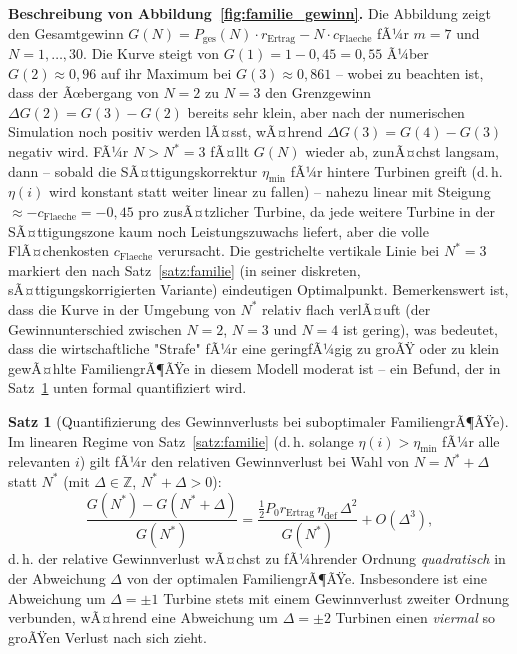 ﻿\documentclass[a4paper,12pt]{article}
\theoremstyle{definition}
\newtheorem{satz}{Satz}
\begin{document}
\textbf{Beschreibung von Abbildung~\ref{fig:familie_gewinn}.}
Die Abbildung zeigt den Gesamtgewinn $G(N)=P_{\mathrm{ges}}(N)\cdot r_{\mathrm{Ertrag}} - N\cdot c_{\mathrm{Flaeche}}$ fÃ¼r $m=7$ und $N=1,\ldots,30$. Die Kurve steigt von $G(1)=1-0{,}45=0{,}55$ Ã¼ber $G(2)\approx0{,}96$ auf ihr Maximum bei $G(3)\approx0{,}861$ -- wobei zu beachten ist, dass der Ãœbergang von $N=2$ zu $N=3$ den Grenzgewinn $\Delta G(2)=G(3)-G(2)$ bereits sehr klein, aber nach der numerischen Simulation noch positiv werden lÃ¤sst, wÃ¤hrend $\Delta G(3)=G(4)-G(3)$ negativ wird. FÃ¼r $N>N^*=3$ fÃ¤llt $G(N)$ wieder ab, zunÃ¤chst langsam, dann -- sobald die SÃ¤ttigungskorrektur $\eta_{\min}$ fÃ¼r hintere Turbinen greift (d.\,h. $\eta(i)$ wird konstant statt weiter linear zu fallen) -- nahezu linear mit Steigung $\approx-c_{\mathrm{Flaeche}}=-0{,}45$ pro zusÃ¤tzlicher Turbine, da jede weitere Turbine in der SÃ¤ttigungszone kaum noch Leistungszuwachs liefert, aber die volle FlÃ¤chenkosten $c_{\mathrm{Flaeche}}$ verursacht. Die gestrichelte vertikale Linie bei $N^*=3$ markiert den nach Satz~\ref{satz:familie} (in seiner diskreten, sÃ¤ttigungskorrigierten Variante) eindeutigen Optimalpunkt. Bemerkenswert ist, dass die Kurve in der Umgebung von $N^*$ relativ flach verlÃ¤uft (der Gewinnunterschied zwischen $N=2$, $N=3$ und $N=4$ ist gering), was bedeutet, dass die wirtschaftliche "Strafe" fÃ¼r eine geringfÃ¼gig zu groÃŸ oder zu klein gewÃ¤hlte FamiliengrÃ¶ÃŸe in diesem Modell moderat ist -- ein Befund, der in Satz~\ref{satz:familie_robustheit} unten formal quantifiziert wird.

\begin{satz}[Quantifizierung des Gewinnverlusts bei suboptimaler FamiliengrÃ¶ÃŸe]
\label{satz:familie_robustheit}
Im linearen Regime von Satz~\ref{satz:familie} (d.\,h. solange $\eta(i)>\eta_{\min}$ fÃ¼r alle relevanten $i$) gilt fÃ¼r den relativen Gewinnverlust bei Wahl von $N=N^*+\Delta$ statt $N^*$ (mit $\Delta\in\mathbb{Z}$, $N^*+\Delta>0$):
\[
\frac{G(N^*)-G(N^*+\Delta)}{G(N^*)} = \frac{\tfrac{1}{2}P_0 r_{\mathrm{Ertrag}}\,\eta_{\mathrm{def}}\,\Delta^2}{G(N^*)} + O(\Delta^3),
\]
d.\,h. der relative Gewinnverlust wÃ¤chst zu fÃ¼hrender Ordnung \emph{quadratisch} in der Abweichung $\Delta$ von der optimalen FamiliengrÃ¶ÃŸe. Insbesondere ist eine Abweichung um $\Delta=\pm1$ Turbine stets mit einem Gewinnverlust zweiter Ordnung verbunden, wÃ¤hrend eine Abweichung um $\Delta=\pm2$ Turbinen einen \emph{viermal} so groÃŸen Verlust nach sich zieht.
\end{satz}
\end{document}
